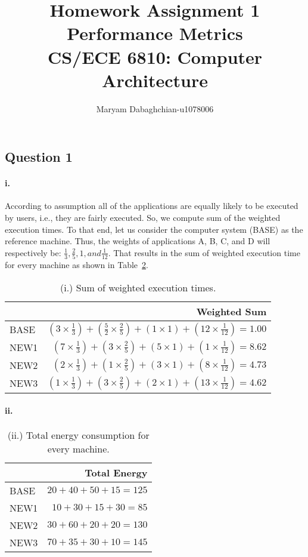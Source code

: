 \documentclass[12pt]{article}
\title{Homework Assignment 1\\
	Performance Metrics\\
	CS/ECE 6810: Computer Architecture}
\author{Maryam Dabaghchian-u1078006}
\newcommand{\q}[1]{\subsection*{Question {#1}}}
\newcommand{\partt}[1]{\paragraph*{{#1}.}}
\begin{document}
\maketitle

\q{1} 

\partt{i} According to assumption all of the applications are equally likely to be 
executed by users, i.e., they are fairly executed. So, we compute sum of the 
weighted execution times. To that end, let us consider the computer system (BASE) 
as the reference machine. Thus, the weights of applications A, B, C, and D will 
respectively be: $\frac{1}{3}, \frac{2}{5}, 1, and \frac{1}{12}$. That results in 
the sum of weighted execution time for every machine as shown in 
Table~\ref{tbl:wext}.

\begin{table}[h]
\center
\begin{tabular}{|l|r|}
	\hline
	 & \textbf{Weighted Sum} \\
	\hline
	BASE & $(3 \times \frac{1}{3}) + (\frac{5}{2} \times \frac{2}{5}) + 
	(1 \times 1) + (12 \times \frac{1}{12}) = 1.00$  \\
	\hline
	NEW1 & $(7 \times \frac{1}{3}) + (3 \times \frac{2}{5}) + 
	(5 \times 1) + (1 \times \frac{1}{12}) = 8.62$ \\
	\hline
	NEW2 & $(2 \times \frac{1}{3}) + (1 \times \frac{2}{5}) + 
	(3 \times 1) + (8 \times \frac{1}{12}) = 4.73$ \\
	\hline
	NEW3 & $(1 \times \frac{1}{3}) + (3 \times \frac{2}{5}) + 
	(2 \times 1) + (13 \times \frac{1}{12}) = 4.62$ \\
	\hline
\end{tabular}
\caption{(i.) Sum of weighted execution times.}
\label{tbl:wext}
\end{table}


\partt{ii}

\begin{table}[h]
\center
\begin{tabular}{|l|r|}
	\hline
	 & \textbf{Total Energy} \\
	\hline
	BASE & $20 + 40 + 50 + 15 = 125$  \\
	\hline
	NEW1 & $10 + 30 + 15 + 30 = 85$ \\
	\hline
	NEW2 & $30 + 60 + 20 + 20 = 130$ \\
	\hline
	NEW3 & $70 + 35 + 30 + 10 = 145$ \\
	\hline
\end{tabular}
\caption{(ii.) Total energy consumption for every machine.}
\label{tbl:wext}
\end{table}
\end{document}
